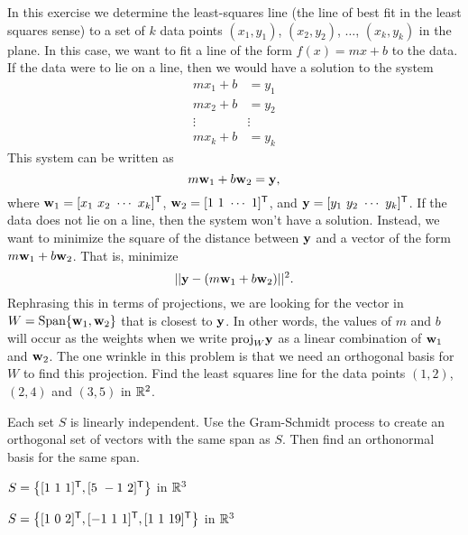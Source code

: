 \item In this exercise we determine the least-squares line (the line of best fit in the least squares sense) to a set of $k$ data points $(x_1,y_1)$, $(x_2,y_2)$, $\ldots$, $(x_k,y_k)$ in the plane. In this case, we want to fit a line of the form $f(x) = mx+b$ to the data. If the data were to lie on a line, then we would have a solution to the system 
\begin{align*}
mx_1 + b &= y_1 \\
mx_2 + b &= y_2 \\
\vdots	& \vdots \\
mx_k + b &= y_k
\end{align*}
This system can be written as 
\[m \mathbf{w}_1 + b\mathbf{w}_2 = \mathbf{y},\]
where $\vw_1 = [x_1 \ x_2 \ \cdots \ x_k]^{\tr}$, $\vw_2 = [1 \ 1 \ \cdots \ 1]^{\tr}$,  and $\vy = [y_1 \ y_2 \ \cdots \ y_k]^{\tr}$. If the data does not lie on a line, then the system won't have a solution. Instead, we want to minimize the square of the distance between $\mathbf{y}$ and a vector of the form $m\mathbf{w}_1 + b \mathbf{w}_2$. That is, minimize
\begin{equation} \label{eq:6_d_LS_line_1} 
||\mathbf{y} - (m \mathbf{w}_1 + b\mathbf{w}_2)||^2.
\end{equation} 
Rephrasing this in terms of projections, we are looking for the vector in $W = \text{Span}\{\mathbf{w}_1, \mathbf{w}_2\}$ that is closest to $\mathbf{y}$.  In other words, the values of $m$ and $b$ will occur as the weights when we write $\text{proj}_{W} \mathbf{y}$ as a linear combination of $\mathbf{w}_1$ and $\mathbf{w}_2$. The one wrinkle in this problem is that we need an orthogonal basis for $W$ to find this projection. Find the least squares line for the data points $(1,2)$, $(2,4)$ and $(3,5)$ in $\mathbb{R}^2$. 
	

\item Each set $S$ is linearly independent. Use the Gram-Schmidt process to create an orthogonal set of vectors with the same span as $S$. Then find an orthonormal basis for the same span. 
	\ba
	\item $S = \left\{[1 \ 1 \ 1]^{\tr}, [5 \ -1 \ 2]^{\tr}\right\}$ in $\mathbb{R}^3$

	\item $S = \left\{[1 \ 0 \ 2]^{\tr}, [-1 \ 1 \ 1]^{\tr},  [1 \ 1 \ 19]^{\tr} \right\}$ in $\mathbb{R}^3$ 

